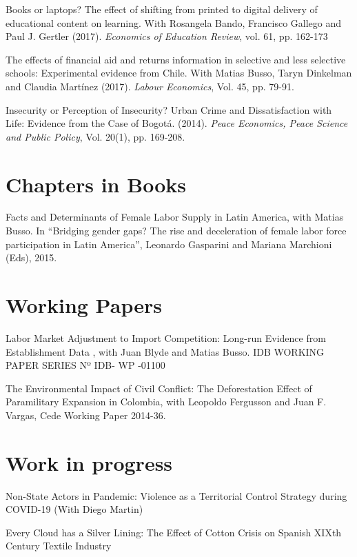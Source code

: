 \documentclass{moderncv}
\begin{document}
{Books or laptops? The effect of shifting from printed to digital delivery of educational content on learning. With Rosangela Bando, Francisco Gallego and Paul J. Gertler (2017). \emph{Economics of Education Review}, vol. 61, pp. 162-173\\} 

{The effects of financial aid and returns information in selective and less selective schools: Experimental evidence from Chile. With Matias Busso, Taryn Dinkelman and Claudia Martínez (2017). \emph{Labour Economics}, Vol. 45, pp. 79-91.\\}

{Insecurity or Perception of Insecurity? Urban Crime and Dissatisfaction with Life: Evidence from the Case of Bogot\'a. (2014). \emph{Peace Economics, Peace Science and Public Policy}, Vol. 20(1), pp. 169-208.}

\section{\textbf{Chapters in Books}}
{Facts and Determinants of Female Labor Supply in Latin America, with Matias Busso. In “Bridging gender gaps? The rise and deceleration of female labor force participation in Latin America”, Leonardo Gasparini and Mariana Marchioni (Eds), 2015.}

\section{\textbf{Working Papers}}

{Labor Market Adjustment to Import Competition: Long-run Evidence from Establishment Data , with Juan Blyde and Matias Busso. IDB WORKING PAPER SERIES Nº IDB- WP -01100 \\}

{The Environmental Impact of Civil Conflict: The Deforestation Effect of Paramilitary Expansion in Colombia, with Leopoldo Fergusson and Juan F. Vargas, Cede Working Paper 2014-36.}

\section{\textbf{Work in progress}}
{Non-State Actors in Pandemic: Violence as a Territorial Control Strategy during COVID-19 (With Diego Martin) \\}

{Every Cloud has a Silver Lining: The Effect of Cotton Crisis on Spanish XIXth Century Textile Industry}\\
\end{document}
